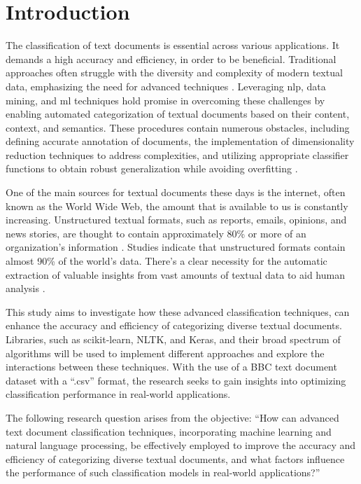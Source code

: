 \chapter{Introduction}

The classification of text documents is essential across various applications. It demands a high accuracy and efficiency, in order to be beneficial. Traditional approaches often struggle with the diversity and complexity of modern textual data, emphasizing the need for advanced techniques \citep{aurangzeb_review_2010}. Leveraging \ac{nlp}, data mining, and \ac{ml} techniques hold promise in overcoming these challenges by enabling automated categorization of textual documents based on their content, context, and semantics. These procedures contain numerous obstacles, including defining accurate annotation of documents, the implementation of dimensionality reduction techniques to address complexities, and utilizing appropriate classifier functions to obtain robust generalization while avoiding overfitting \citep{aurangzeb_review_2010}.

One of the main sources for textual documents these days is the internet, often known as the World Wide Web, the amount that is available to us is constantly increasing. Unstructured textual formats, such as reports, emails, opinions, and news stories, are thought to contain approximately 80\% or more of an organization's information \citep{aurangzeb_review_2010}. Studies indicate that unstructured formats contain almost 90\% of the world's data. There's a clear necessity for the automatic extraction of valuable insights from vast amounts of textual data to aid human analysis \citep{aurangzeb_review_2010}.

This study aims to investigate how these advanced classification techniques, can enhance the accuracy and efficiency of categorizing diverse textual documents. Libraries, such as scikit-learn, NLTK, and Keras, and their broad spectrum of algorithms will be used to implement different approaches and explore the interactions between these techniques. With the use of a BBC text document dataset with a “.csv” format, the research seeks to gain insights into optimizing classification performance in real-world applications.

The following research question arises from the objective: “How can advanced text document classification techniques, incorporating machine learning and natural language processing, be effectively employed to improve the accuracy and efficiency of categorizing diverse textual documents, and what factors influence the performance of such classification models in real-world applications?”

